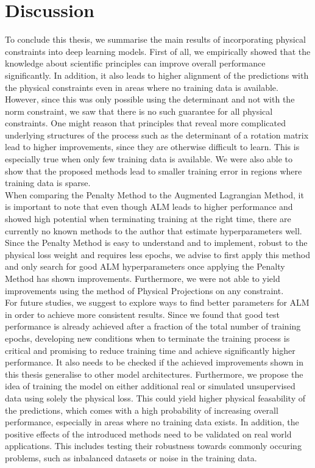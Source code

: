 \label{section:discussion}
\section{Discussion}

To conclude this thesis, we summarise the main results of incorporating physical constraints into deep learning models. First of all, we empirically showed that the knowledge about scientific principles can improve overall performance significantly. In addition, it also leads to higher alignment of the predictions with the physical constraints even in areas where no training data is available. However, since this was only possible using the determinant and not with the norm constraint, we saw that there is no such guarantee for all physical constraints. One might reason that principles that reveal more complicated underlying structures of the process such as the determinant of a rotation matrix lead to higher improvements, since they are otherwise difficult to learn. This is especially true when only few training data is available. We were also able to show that the proposed methods lead to smaller training error in regions where training data is sparse.\\
\indent When comparing the Penalty Method to the Augmented Lagrangian Method, it is important to note that even though ALM leads to higher performance and showed high potential when terminating training at the right time, there are currently no known methods to the author that estimate hyperparameters well. Since the Penalty Method is easy to understand   and to implement, robust to the physical loss weight and requires less epochs, we advise to first apply this method and only search for good ALM hyperparameters once applying the Penalty Method has shown improvements. Furthermore, we were not able to yield improvements using the method of Physical Projections on any constraint.\\
\indent For future studies, we suggest to explore ways to find better parameters for ALM in order to achieve more consistent results. Since we found that good test performance is already achieved after a fraction of the total number of training epochs, developing new conditions when to terminate the training process is critical and promising to reduce training time and achieve significantly higher performance. It also needs to be checked if the achieved improvements shown in this thesis generalise to other model architectures. Furthermore, we propose the idea of training the model on either additional real or simulated unsupervised data using solely the physical loss. This could yield higher physical feasability of the predictions, which comes with a high probability of increasing overall performance, especially in areas where no training data exists. In addition, the positive effects of the introduced methods need to be validated on real world applications. This includes testing their robustness towards commonly occuring problems, such as inbalanced datasets or noise in the training data.\\






\clearpage

